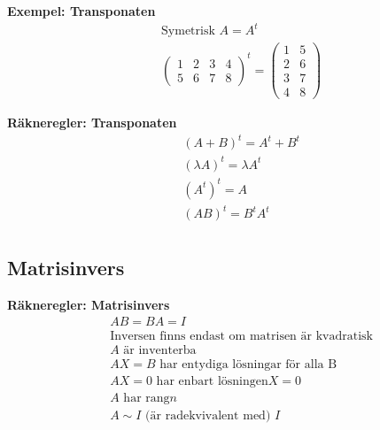 \begin{multicols}{2}
\textbf{Exempel: Transponaten}
\begin{align*}
  &\quad  \text{Symetrisk } A=A^t \\
  &\quad
  \left(\begin{array}{cccc}
    1 & 2 & 3 & 4 \\
    5 & 6 & 7 & 8
  \end{array}\right)^t =
  \left(\begin{array}{cc}
    1 & 5 \\
    2 & 6 \\
    3 & 7 \\
    4 & 8
  \end{array}\right)
\end{align*}

\textbf{Räkneregler: Transponaten}
\begin{align*}
  &\quad  {(A+B)}^t = A^t+B^t \\
  &\quad  {(\lambda A)}^t = \lambda A^t \\
  &\quad  {(A^t)}^t = A \\
  &\quad  {(AB)}^t = B^t A^t \\
\end{align*}


\subsection{Matrisinvers}
\textbf{Räkneregler: Matrisinvers }
\begin{align*}
  &\quad  AB=BA=I \\
  &\quad  \text{Inversen finns endast om matrisen är kvadratisk} \\
  &\quad  A \text{ är inventerba} \\
  &\quad  AX=B \text{ har entydiga lösningar för alla B} \\
  &\quad  AX=0 \text{ har enbart lösningen} X=0 \\
  &\quad  A \text{ har rang} n \\
  &\quad  A \sim I  \text{ (är radekvivalent med) } I
\end{align*}


\end{multicols}
